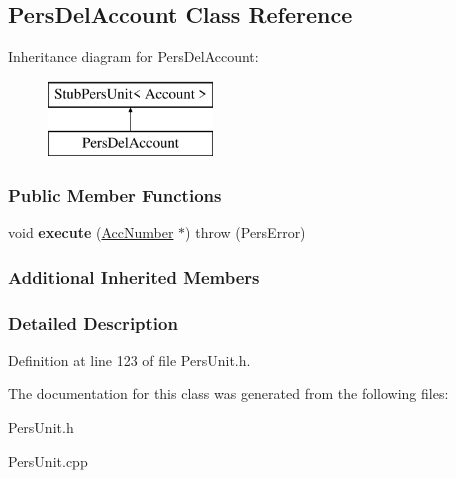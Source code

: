 \hypertarget{classPersDelAccount}{\subsection{Pers\-Del\-Account Class Reference}
\label{d6/d74/classPersDelAccount}
}
Inheritance diagram for Pers\-Del\-Account\-:\begin{figure}[H]
\begin{center}
\leavevmode
\includegraphics[height=2.000000cm]{d6/d74/classPersDelAccount}
\end{center}
\end{figure}
\subsubsection*{Public Member Functions}
\begin{DoxyCompactItemize}
\item 
\hypertarget{classPersDelAccount_a711d6dc413c1bc56ec70225ca6734c67}{void {\bfseries execute} (\hyperlink{classAccNumber}{Acc\-Number} $\ast$)  throw (\-Pers\-Error)}\label{d6/d74/classPersDelAccount_a711d6dc413c1bc56ec70225ca6734c67}

\end{DoxyCompactItemize}
\subsubsection*{Additional Inherited Members}


\subsubsection{Detailed Description}


Definition at line 123 of file Pers\-Unit.\-h.



The documentation for this class was generated from the following files\-:\begin{DoxyCompactItemize}
\item 
Pers\-Unit.\-h\item 
Pers\-Unit.\-cpp\end{DoxyCompactItemize}
